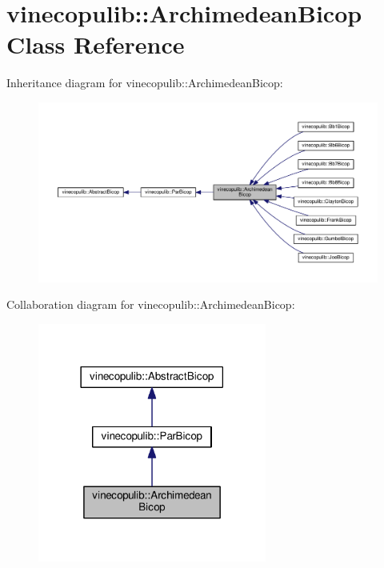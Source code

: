\hypertarget{classvinecopulib_1_1_archimedean_bicop}{}\section{vinecopulib\+:\+:Archimedean\+Bicop Class Reference}
\label{classvinecopulib_1_1_archimedean_bicop}


Inheritance diagram for vinecopulib\+:\+:Archimedean\+Bicop\+:\nopagebreak
\begin{figure}[H]
\begin{center}
\leavevmode
\includegraphics[width=350pt]{classvinecopulib_1_1_archimedean_bicop__inherit__graph}
\end{center}
\end{figure}


Collaboration diagram for vinecopulib\+:\+:Archimedean\+Bicop\+:\nopagebreak
\begin{figure}[H]
\begin{center}
\leavevmode
\includegraphics[width=213pt]{classvinecopulib_1_1_archimedean_bicop__coll__graph}
\end{center}
\end{figure}
